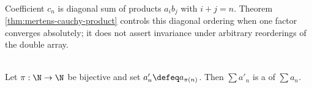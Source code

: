 \begin{perspective} \label{per:cauchy-product-diagonal-ordering} \\
Coefficient $c_n$ is diagonal sum of products $a_i b_j$ with $i+j=n$. Theorem \ref{thm:mertens-cauchy-product} controls this diagonal ordering when one factor converges absolutely; it does not assert invariance under arbitrary reorderings of the double array.
\end{perspective}

\begin{definition} \label{def:series-rearrangement} \\
Let $\pi:\N\to\N$ be bijective and set $a'_n\defeq a_{\pi(n)}$. Then $\sum a'_n$ is a  of $\sum a_n$.
\end{definition}

